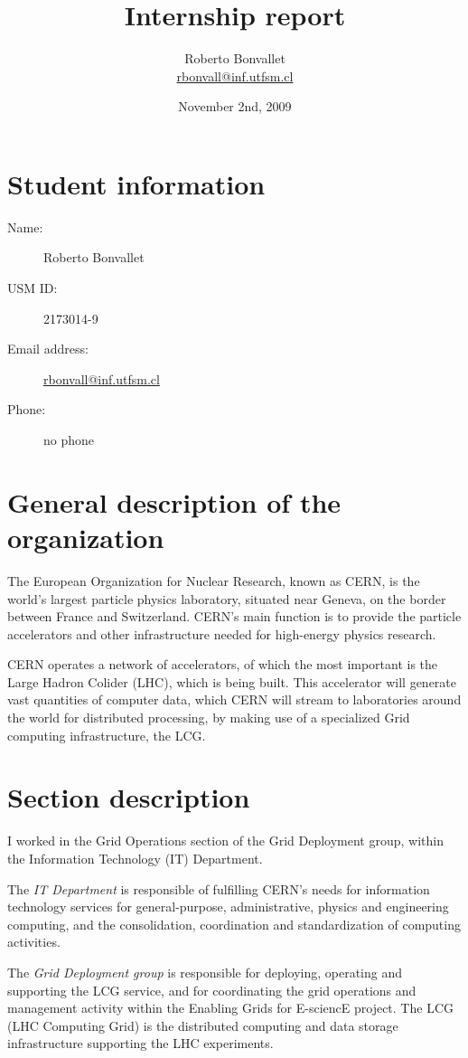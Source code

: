 \documentclass[12pt]{article}
\title{Internship report}
\author{Roberto Bonvallet \\ \url{rbonvall@inf.utfsm.cl}}
\date{November 2nd, 2009}
\begin{document}
  \maketitle

  \section{Student information}
  \begin{description}
    \item[Name:] Roberto Bonvallet
    \item[USM ID:] 2173014-9
    \item[Email address:] \url{rbonvall@inf.utfsm.cl}
    \item[Phone:] no phone
  \end{description}

  \section{General description of the organization}
    The European Organization for Nuclear Research, known as CERN, is the
    world's largest particle physics laboratory, situated near Geneva,
    on the border between France and Switzerland.  CERN's main function is to
    provide the particle accelerators and other infrastructure needed for
    high-energy physics research.

    CERN operates a network of accelerators, of which the most important is the
    Large Hadron Colider (LHC), which is being built.  This accelerator will
    generate vast quantities of computer data, which CERN will stream to
    laboratories around the world for distributed processing, by making use of
    a specialized Grid computing infrastructure, the LCG.

  \section{Section description}
    I worked in the Grid Operations section of the Grid Deployment
    group, within the Information Technology (IT) Department.

    The \emph{IT Department} is responsible of fulfilling CERN's needs for information
    technology services for general-purpose, administrative, physics and
    engineering computing, and the consolidation, coordination and
    standardization of computing activities.

    The \emph{Grid Deployment group} is responsible for deploying, operating and
    supporting the LCG service, and for coordinating the grid operations and
    management activity within the Enabling Grids for E-sciencE project. 
    The LCG (LHC Computing Grid) is the distributed computing and data
    storage infrastructure supporting the LHC experiments.
\end{document}
